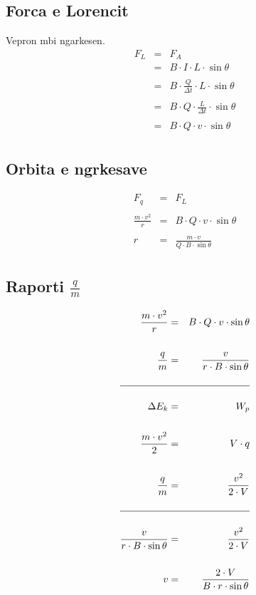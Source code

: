 \documentclass[a4paper, twocolumn]{article}
\begin{document}
\subsection{Forca e Lorencit}
Vepron mbi ngarkesen.
\begin{eqnarray*}
	F_{L} &=& F_{A}\\
	      &=&B\cdot I\cdot L\cdot \sin{\theta}\\
	      \\
	      &=&B\cdot \frac{Q}{\Delta t} \cdot L \cdot \sin{\theta}\\
	      \\
	      &=&B\cdot Q\cdot \frac{L}{\Delta t}  \cdot \sin{\theta}\\
	      \\
	      &=&B\cdot Q\cdot v\cdot \sin{\theta}\\
\end{eqnarray*}
\subsection{Orbita e ngrkesave}
\begin{eqnarray*}
	F_{q}&=& F_{L} \\
	\\
	\frac{m\cdot v^2}{r}&=&B\cdot Q\cdot v\cdot \sin{\theta}\\
	\\
	r &=& \frac{m\cdot v}{Q\cdot B\cdot \sin{\theta}}\\
\end{eqnarray*}
\subsection{Raporti $\frac{q}{m}$}
\begin{eqnarray*}
	\frac{m\cdot v^2}{r}&=&B\cdot Q\cdot v\cdot \sin{\theta}\\
	\\
	\frac{q}{m}&=&\frac{v}{r\cdot B\cdot \sin{\theta}}\\
	\\
	\hline\\
	\Delta E_{k} &=& W_{p}\\
	\\
	\frac{m\cdot v^2}{2}&=&V\cdot q\\
	\\
	\frac{q}{m}&=&\frac{v^2}{2\cdot V}\\
	\\
	\hline\\
	\frac{v}{r\cdot B\cdot \sin{\theta}}&=&\frac{v^2}{2\cdot V}\\
	\\
	v&=&\frac{2\cdot V}{B\cdot r\cdot \sin{\theta}}
\end{eqnarray*}
\end{document}
